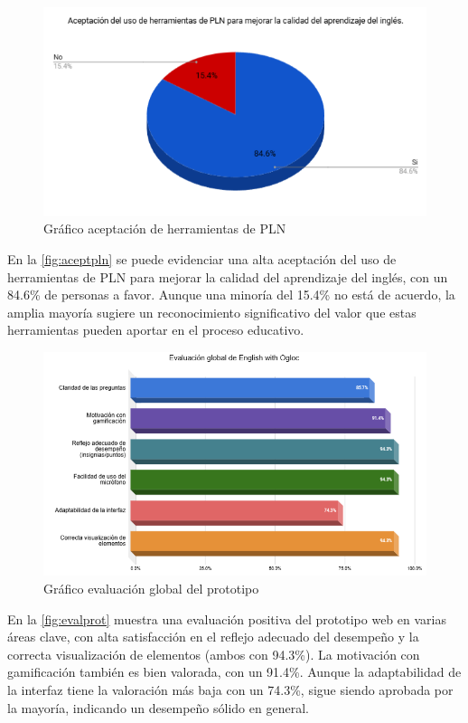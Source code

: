 \begin{figure}[H]
  \centering
  \includegraphics[width=0.8\linewidth]{Imagenes/Grafico 2 aceptacion del pln.png}
  \caption{Gráfico aceptación de herramientas de PLN}
  \label{fig:aceptpln}
\end{figure}


En la \autoref{fig:aceptpln} se puede evidenciar una alta aceptación del uso de herramientas de PLN para mejorar la calidad del aprendizaje del inglés, con un 84.6\% de personas a favor. Aunque una minoría del 15.4\% no está de acuerdo, la amplia mayoría sugiere un reconocimiento significativo del valor que estas herramientas pueden aportar en el proceso educativo.
\newpage
\begin{figure}[H]
  \centering
  \includegraphics[width=0.9\linewidth]{Imagenes/Grafico 3 barras aceptacion general del prototipo.png}
  \caption{Gráfico evaluación global del prototipo}
  \label{fig:evalprot}
\end{figure}

En la \autoref{fig:evalprot} muestra una evaluación positiva del prototipo web en varias áreas clave, con alta satisfacción en el reflejo adecuado del desempeño y la correcta visualización de elementos (ambos con 94.3\%). La motivación con gamificación también es bien valorada, con un 91.4\%. Aunque la adaptabilidad de la interfaz tiene la valoración más baja con un 74.3\%, sigue siendo aprobada por la mayoría, indicando un desempeño sólido en general.

